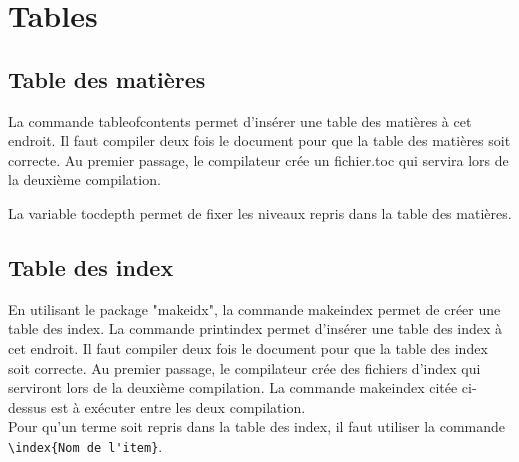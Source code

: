 \section{Tables}

\subsection{Table des matières}

La commande tableofcontents permet d'insérer une table des matières à cet endroit. Il faut compiler deux fois le document pour que la table des matières soit correcte. Au premier passage, le compilateur crée un fichier.toc qui servira lors de la deuxième compilation.

La variable tocdepth permet de fixer les niveaux repris dans la table des matières.

\subsection{Table des index}
En utilisant le package "makeidx", la commande makeindex permet de créer une table des index. La commande printindex permet d'insérer une table des index à cet endroit. Il faut compiler deux fois le document pour que la table des index soit correcte. Au premier passage, le compilateur crée des fichiers d'index qui serviront lors de la deuxième compilation. La commande makeindex citée ci-dessus est à exécuter entre les deux compilation.\\
Pour qu'un terme soit repris dans la table des index, il faut utiliser la commande 
\verb+\index{Nom de l'item}+.

